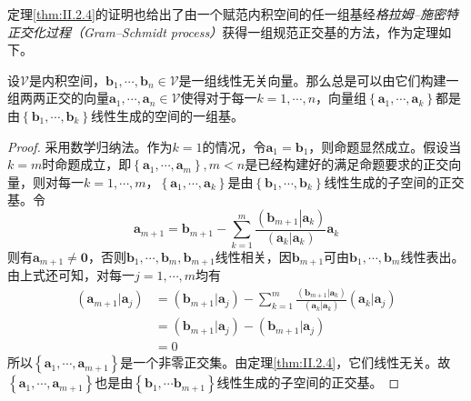 \documentclass[../main.tex]{subfiles}
\begin{document}
定理\ref{thm:II.2.4}的证明也给出了由一个赋范内积空间的任一组基经\emph{格拉姆--施密特正交化过程（Gram--Schmidt process）}获得一组规范正交基的方法，作为定理如下。

\begin{theorem}\label{thm:II.2.5}
    设$\mathcal{V}$是内积空间，$\mathbf{b}_1,\cdots,\mathbf{b}_n\in\mathcal{V}$是一组线性无关向量。那么总是可以由它们构建一组两两正交的向量$\mathbf{a}_1,\cdots,\mathbf{a}_n\in\mathcal{V}$使得对于每一$k=1,\cdots,n$，向量组$\left\{\mathbf{a}_1,\cdots,\mathbf{a}_k\right\}$都是由$\left\{\mathbf{b}_1,\cdots,\mathbf{b}_k\right\}$线性生成的空间的一组基。
\end{theorem}
\begin{proof}
    采用数学归纳法。作为$k=1$的情况，令$\mathbf{a}_1=\mathbf{b}_1$，则命题显然成立。假设当$k=m$时命题成立，即$\left\{\mathbf{a}_1,\cdots,\mathbf{a}_m\right\},m<n$是已经构建好的满足命题要求的正交向量，则对每一$k=1,\cdots,m$，$\left\{\mathbf{a}_1,\cdots,\mathbf{a}_k\right\}$是由$\left\{\mathbf{b}_1,\cdots,\mathbf{b}_k\right\}$线性生成的子空间的正交基。令
    \[
        \mathbf{a}_{m+1}=\mathbf{b}_{m+1}-\sum_{k=1}^m\frac{\left(\left.\mathbf{b}_{m+1}\right|\left.\mathbf{a}_k\right.\right)}{\left(\mathbf{a}_k|\mathbf{a}_k\right)}\mathbf{a}_k
    \]
    则有$\mathbf{a}_{m+1}\neq\mathbf{0}$，否则$\mathbf{b}_1,\cdots,\mathbf{b}_m,\mathbf{b}_{m+1}$线性相关，因$\mathbf{b}_{m+1}$可由$\mathbf{b}_1,\cdots,\mathbf{b}_m$线性表出。由上式还可知，对每一$j=1,\cdots,m$均有
    \begin{align*}
        \left(\mathbf{a}_{m+1}|\mathbf{a}_j\right) & =\left(\mathbf{b}_{m+1}|\mathbf{a}_j\right)-\sum_{k=1}^m\frac{\left(\mathbf{b}_{m+1}|\mathbf{a}_k\right)}{\left(\mathbf{a}_k|\mathbf{a}_k\right)}\left(\mathbf{a}_k|\mathbf{a}_j\right) \\
                                                   & =\left(\mathbf{b}_{m+1}|\mathbf{a}_j\right)-\left(\mathbf{b}_{m+1}|\mathbf{a}_j\right)                                                                                                  \\
                                                   & =0
    \end{align*}
    所以$\left\{\mathbf{a}_1,\cdots,\mathbf{a}_{m+1}\right\}$是一个非零正交集。由定理\ref{thm:II.2.4}，它们线性无关。故$\left\{\mathbf{a}_1,\cdots,\mathbf{a}_{m+1}\right\}$也是由$\left\{\mathbf{b}_1,\cdots\mathbf{b}_{m+1}\right\}$线性生成的子空间的正交基。
\end{proof}
\end{document}
